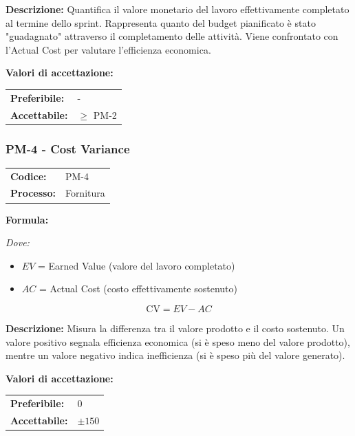 \documentclass[a4paper,11pt,oneside]{scrartcl}
\begin{document}
\noindent\textbf{Descrizione:} Quantifica il valore monetario del lavoro effettivamente completato al termine dello sprint. Rappresenta quanto del budget pianificato è stato "guadagnato" attraverso il completamento delle attività. Viene confrontato con l'Actual Cost per valutare l'efficienza economica.

\vspace{0.2cm}
\noindent\textbf{Valori di accettazione:}
\vspace{0.1cm}

\noindent
\begin{tabular}{@{}ll@{}}
\textbf{Preferibile:} & - \\
\textbf{Accettabile:} & $\geq$ PM-2 \\
\end{tabular}

\subsubsection{PM-4 - Cost Variance}

\noindent
\begin{tabular}{@{}p{}p{}@{}}
\textbf{Codice:} & PM-4 \\
\textbf{Processo:} & Fornitura \\
\end{tabular}

\vspace{0.3cm}
\noindent\textbf{Formula:}

\noindent\textit{Dove:}
\begin{itemize}[leftmargin=1.5cm, topsep=0pt, itemsep=0pt]
    \item $EV$ = Earned Value (valore del lavoro completato)
    \item $AC$ = Actual Cost (costo effettivamente sostenuto)
\end{itemize}

\[
\text{CV} = EV - AC
\]

\noindent\textbf{Descrizione:} Misura la differenza tra il valore prodotto e il costo sostenuto. Un valore positivo segnala efficienza economica (si è speso meno del valore prodotto), mentre un valore negativo indica inefficienza (si è speso più del valore generato).

\vspace{0.2cm}
\noindent\textbf{Valori di accettazione:}
\vspace{0.1cm}

\noindent
\begin{tabular}{@{}ll@{}}
\textbf{Preferibile:} & $0$ \\
\textbf{Accettabile:} & $\pm 150$ \\
\end{tabular}
\end{document}
